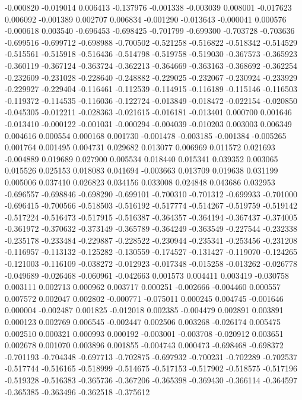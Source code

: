 -0.000820
-0.019014
0.006413
-0.137976
-0.001338
-0.003039
0.008001
-0.017623
0.006092
-0.001389
0.002707
0.006834
-0.001290
-0.013643
-0.000041
0.000576
-0.000618
0.003540
-0.696453
-0.698425
-0.701799
-0.699300
-0.703728
-0.703636
-0.699516
-0.699712
-0.698988
-0.700502
-0.521258
-0.516822
-0.518342
-0.514529
-0.515561
-0.515918
-0.516436
-0.514798
-0.519758
-0.519030
-0.367573
-0.365923
-0.360119
-0.367124
-0.363724
-0.362213
-0.364669
-0.363163
-0.368692
-0.362254
-0.232609
-0.231028
-0.228640
-0.248882
-0.229025
-0.232067
-0.230924
-0.233929
-0.229927
-0.229404
-0.116461
-0.112539
-0.114915
-0.116189
-0.115146
-0.116503
-0.119372
-0.114535
-0.116036
-0.122724
-0.013849
-0.018472
-0.022154
-0.020850
-0.045305
-0.012211
-0.028363
-0.021615
-0.016181
-0.013401
0.000700
0.001646
-0.013410
-0.000122
-0.001031
-0.000294
-0.004039
-0.010203
0.003003
0.006349
0.004616
0.000554
0.000168
0.001730
-0.001478
-0.003185
-0.001384
-0.005265
0.001764
0.001495
0.004731
0.029682
0.013077
0.006969
0.011572
0.021693
-0.004889
0.019689
0.027900
0.005534
0.018440
0.015341
0.039352
0.003065
0.015526
0.025153
0.018083
0.041694
-0.003663
0.013709
0.019638
0.031199
0.005006
0.037410
0.026823
0.034156
0.033008
0.024848
0.043686
0.032953
-0.696557
-0.698846
-0.698290
-0.699101
-0.700310
-0.701312
-0.699933
-0.701000
-0.696415
-0.700566
-0.518503
-0.516192
-0.517774
-0.514267
-0.519759
-0.519142
-0.517224
-0.516473
-0.517915
-0.516387
-0.364357
-0.364194
-0.367437
-0.374005
-0.361972
-0.370632
-0.373149
-0.365789
-0.364249
-0.363549
-0.227544
-0.232338
-0.235178
-0.233484
-0.229887
-0.228522
-0.230944
-0.235341
-0.253456
-0.231208
-0.116957
-0.113132
-0.125282
-0.130559
-0.174527
-0.131427
-0.119070
-0.124265
-0.121003
-0.116109
-0.038272
-0.012923
-0.017348
-0.015258
-0.013262
-0.026778
-0.049689
-0.026468
-0.060961
-0.042663
0.001573
0.004411
0.003419
-0.030758
0.003111
0.002713
0.000962
0.003717
0.000251
-0.002666
-0.004460
0.000557
0.007572
0.002047
0.002802
-0.000771
-0.075011
0.000245
0.004745
-0.001646
0.000004
-0.002487
0.001825
-0.012018
0.002385
-0.004479
0.002891
0.003891
0.000123
0.002769
0.006545
-0.002447
0.002506
0.003268
-0.026174
0.005475
0.002510
0.000321
0.000993
0.000192
-0.003001
-0.003708
-0.020912
0.003651
0.002678
0.001070
0.003896
0.001855
-0.004743
0.000473
-0.698468
-0.698372
-0.701193
-0.704348
-0.697713
-0.702875
-0.697932
-0.700231
-0.702289
-0.702537
-0.517744
-0.516165
-0.518999
-0.514675
-0.517153
-0.517902
-0.518575
-0.517196
-0.519328
-0.516383
-0.365736
-0.367206
-0.365398
-0.369430
-0.366114
-0.364597
-0.365385
-0.363496
-0.362518
-0.375612
